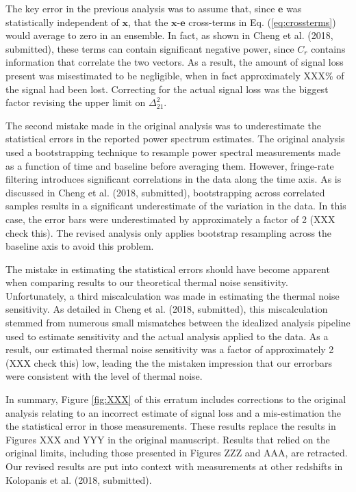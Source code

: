 \documentclass[onecolumn]{emulateapj} \shorttitle{}
\newcommand{\kolopaniscitet}{Kolopanis et al. (2018, submitted)}
\newcommand{\chengcitet}{Cheng et al. (2018, submitted)}
\begin{document}
The key error in the previous analysis was to assume that, since $\mathbf e$ was statistically independent of $\mathbf x$, that
the $\mathbf x$-$\mathbf e$ cross-terms in Eq. (\ref{eq:crossterms}) would average to zero in an ensemble.  In fact, as shown
in \chengcitet, these terms can contain significant negative power, since $C_r$ contains information that correlate the
two vectors.  As a result, the amount of signal loss present was misestimated to be negligible, when in fact approximately
XXX\% of the signal had been lost.  Correcting for the actual signal loss was the biggest factor revising the upper limit
on $\Delta^2_{21}$.

The second mistake made in the original analysis was to underestimate the statistical errors in the reported power spectrum
estimates.  The original analysis used a bootstrapping technique to resample power spectral measurements made as a function
of time and baseline before averaging them.  However, fringe-rate filtering introduces significant correlations in the data
along the time axis.  As is discussed in \chengcitet, bootstrapping across correlated samples results in a significant underestimate
of the variation in the data.  In this case, the error bars were underestimated by approximately a factor of 2 (XXX check this).
The revised analysis only applies bootstrap resampling across the baseline axis to avoid this problem.

The mistake in estimating the statistical errors should have become apparent when comparing results to our theoretical
thermal noise sensitivity.  Unfortunately, a third miscalculation was made in estimating the thermal noise sensitivity.
As detailed in \chengcitet, this miscalculation stemmed from numerous small mismatches between the idealized analysis
pipeline used to estimate sensitivity and the actual analysis applied to the data.  As a result, our estimated thermal
noise sensitivity was a factor of approximately 2 (XXX check this) low, leading the the mistaken impression that our
errorbars were consistent with the level of thermal noise.

In summary, Figure \ref{fig:XXX} of this erratum includes corrections to the original analysis relating to
an incorrect estimate of signal loss and a mis-estimation the the statistical error in those measurements.
These results replace the results in Figures XXX and YYY in the original manuscript.  Results that relied on
the original limits, including those presented in Figures ZZZ and AAA, are retracted.
Our revised results are put into context with measurements at other redshifts in \kolopaniscitet.  



\end{document}
